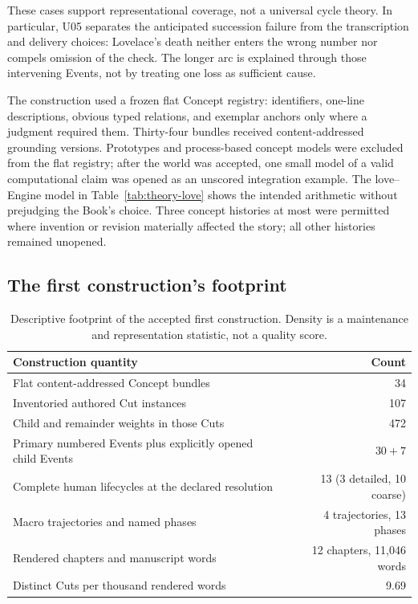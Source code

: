 \documentclass[11pt,a4paper]{article}
\begin{document}
These cases support representational coverage, not a universal cycle theory.
In particular, U05 separates the anticipated succession failure from the
transcription and delivery choices: Lovelace's death neither enters the wrong
number nor compels omission of the check. The longer arc is explained through
those intervening Events, not by treating one loss as sufficient cause.

The construction used a frozen flat Concept registry: identifiers,
one-line descriptions, obvious typed relations, and exemplar anchors only
where a judgment required them. Thirty-four bundles received content-addressed
grounding versions. Prototypes and process-based concept models were excluded from the
flat registry; after the world was accepted, one small model of a valid
computational claim was opened as an unscored integration example. The
love--Engine model in
Table~\ref{tab:theory-love} shows the intended arithmetic without prejudging
the Book's choice. Three concept histories at most were permitted where
invention or revision materially affected the story; all other histories
remained unopened.

\subsection{The first construction's footprint}
\label{app:book-numbers}

\begin{table}[htbp]
\centering
\small
\begin{tabularx}{\textwidth}{@{}Y r@{}}
\toprule
Construction quantity & Count \\
\midrule
Flat content-addressed Concept bundles & 34 \\
Inventoried authored Cut instances & 107 \\
Child and remainder weights in those Cuts & 472 \\
Primary numbered Events plus explicitly opened child Events & $30+7$ \\
Complete human lifecycles at the declared resolution & 13 (3 detailed, 10 coarse) \\
Macro trajectories and named phases & 4 trajectories, 13 phases \\
Rendered chapters and manuscript words & 12 chapters, 11,046 words \\
Distinct Cuts per thousand rendered words & 9.69 \\
\bottomrule
\end{tabularx}
\caption{Descriptive footprint of the accepted first construction. Density is
a maintenance and representation statistic, not a quality score.}
\label{tab:book-footprint}
\end{table}
\end{document}
